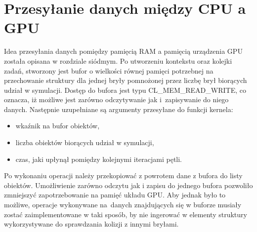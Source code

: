\section{Przesyłanie danych między CPU a GPU}
Idea przesyłania danych pomiędzy pamięcią RAM a pamięcią urządzenia GPU została opisana w rozdziale siódmym. Po utworzeniu kontekstu oraz kolejki zadań, stworzony jest bufor o wielkości równej pamięci potrzebnej na przechowanie struktury dla jednej bryły pomnożonej przez liczbę brył biorących udział w symulacji. Dostęp do bufora jest typu CL\_MEM\_READ\_WRITE, co oznacza, iż możliwe jest zarówno odczytywanie jak i~zapisywanie do niego danych. Następnie uzupełniane są argumenty przesyłane do funkcji kernela:
\begin{itemize}
\item wkaźnik na bufor obiektów,
\item liczba obiektów biorących udział w symulacji,
\item czas, jaki upłynął pomiędzy kolejnymi iteracjami pętli.
\end{itemize}
Po wykonaniu operacji należy przekopiować z powrotem dane z bufora do listy obiektów. Umożliwienie zarówno odczytu jak i zapisu do jednego bufora pozwoliło zmniejszyć zapotrzebowanie na pamięć układu GPU. Aby jednak było to możliwe, operacje wykonywane na~danych znajdujących się w buforze musiały zostać zaimplementowane w taki sposób, by nie ingerować w elementy struktury wykorzystywane do sprawdzania kolizji z innymi bryłami.